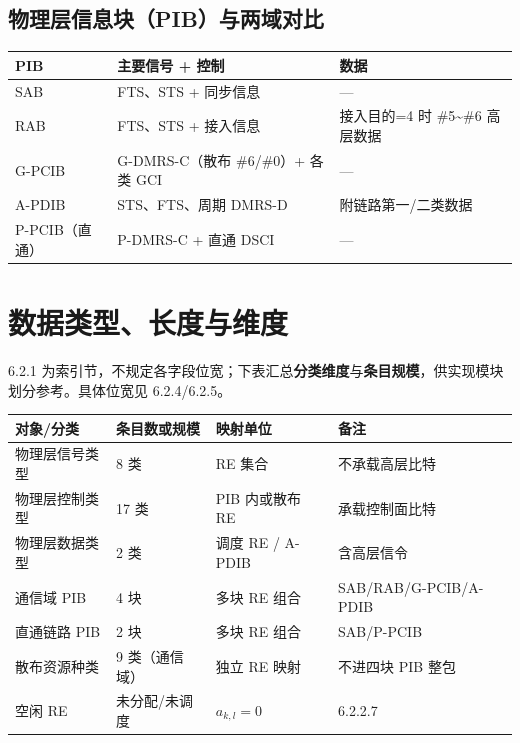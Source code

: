 \documentclass[11pt,a4paper]{ctexart}
\begin{document}
\subsection{物理层信息块（PIB）与两域对比}

\begin{table}[h]
\centering
\small
\begin{tabular}{lll}
\toprule
\textbf{PIB} & \textbf{主要信号 + 控制} & \textbf{数据} \\
\midrule
SAB & FTS、STS + 同步信息 & --- \\
RAB & FTS、STS + 接入信息 & 接入目的=4 时 \#5\textasciitilde\#6 高层数据 \\
G-PCIB & G-DMRS-C（散布 \#6/\#0）+ 各类 GCI & --- \\
A-PDIB & STS、FTS、周期 DMRS-D & 附链路第一/二类数据 \\
P-PCIB（直通） & P-DMRS-C + 直通 DSCI & --- \\
\bottomrule
\end{tabular}
\end{table}

\section{数据类型、长度与维度}

6.2.1 为索引节，不规定各字段位宽；下表汇总\textbf{分类维度}与\textbf{条目规模}，供实现模块划分参考。具体位宽见 6.2.4/6.2.5。

\begin{table}[h]
\centering
\small
\begin{tabular}{llll}
\toprule
\textbf{对象/分类} & \textbf{条目数或规模} & \textbf{映射单位} & \textbf{备注} \\
\midrule
物理层信号类型 & 8 类 & RE 集合 & 不承载高层比特 \\
物理层控制类型 & 17 类 & PIB 内或散布 RE & 承载控制面比特 \\
物理层数据类型 & 2 类 & 调度 RE / A-PDIB & 含高层信令 \\
通信域 PIB & 4 块 & 多块 RE 组合 & SAB/RAB/G-PCIB/A-PDIB \\
直通链路 PIB & 2 块 & 多块 RE 组合 & SAB/P-PCIB \\
散布资源种类 & 9 类（通信域） & 独立 RE 映射 & 不进四块 PIB 整包 \\
空闲 RE & 未分配/未调度 & $a_{k,l}{=}0$ & 6.2.2.7 \\
\bottomrule
\end{tabular}
\end{table}
\end{document}
